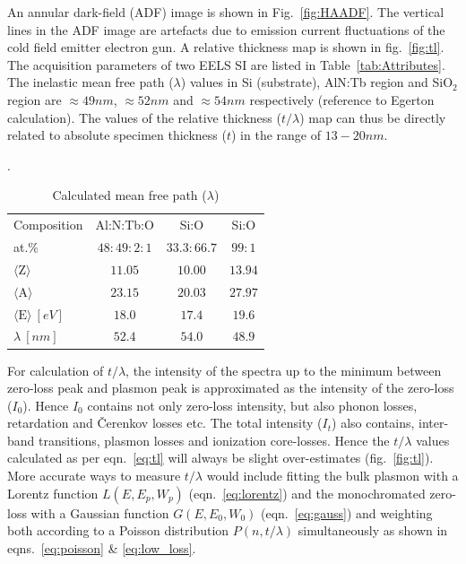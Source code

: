 \documentclass[%
 aip,
rsi,%
 amsmath,amssymb,
 reprint,%
]{revtex4-1}
\begin{document}
An annular dark-field (ADF) image is shown in Fig.~\ref{fig:HAADF}. The vertical lines in the ADF image are artefacts due to emission current fluctuations of the cold field emitter electron gun. A relative thickness map is shown in fig.~\ref{fig:tl}. The acquisition parameters of two EELS SI are listed in Table~\ref{tab:Attributes}. The inelastic mean free path ($\lambda$) values in Si (substrate), AlN:Tb region and SiO$_2$ region are $\approx49nm$, $\approx52nm$ and $\approx54nm$ respectively (reference to Egerton calculation). The values of the relative thickness ($t/\lambda$) map can thus be directly related to absolute specimen thickness ($t$) in the range of $13-20nm$.
\begin{table}
	\caption{Calculated mean free path ($\lambda$)}.
    \label{tab:lambda}
    \begin{ruledtabular}
    	\begin{tabular}{lccc}
        	Composition&Al:N:Tb:O&Si:O&Si:O										\\
            at.\%&$48:49:2:1$&$33.3:66.7$&$99:1$								\\ \hline
        	$\langle \text{Z} \rangle$&$11.05$&$10.00$&$13.94$					\\
            $\langle \text{A} \rangle$&$23.15$&$20.03$&$27.97$					\\
            $\langle \text{E} \rangle~\left[eV\right]$&$18.0$&$17.4$&$19.6$		\\
           	$\lambda~\left[nm\right]$&$52.4$&$54.0$&$48.9$
    	\end{tabular}
    \end{ruledtabular}
\end{table}
For calculation of $t/\lambda$, the intensity of the spectra up to the minimum between zero-loss peak and plasmon peak is approximated as the intensity of the zero-loss ($I_0$). Hence $I_0$ contains not only zero-loss intensity, but also phonon losses, retardation and \v{C}erenkov losses etc. The total intensity ($I_t$) also contains, inter-band transitions, plasmon losses and ionization core-losses. Hence the $t/\lambda$ values calculated as per eqn.~\ref{eq:tl} will always be slight over-estimates (fig.~\ref{fig:tl}). More accurate ways to measure $t/\lambda$ would include fitting the bulk plasmon with a Lorentz function $L(E,E_p,W_p)$ (eqn.~\ref{eq:lorentz}) and the monochromated zero-loss with a Gaussian function $G(E,E_0,W_0)$ (eqn.~\ref{eq:gauss}) and weighting both according to a Poisson distribution $P(n,t/\lambda)$ simultaneously as shown in eqns.~\ref{eq:poisson} \& \ref{eq:low_loss}.
\end{document}
